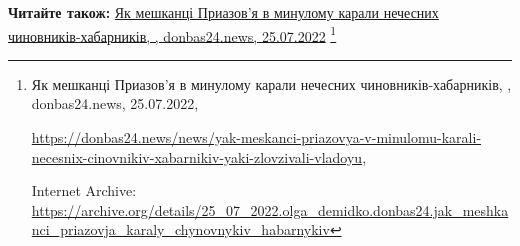  
 
 
 
 

\def\pubIA{https://archive.org/details/25_07_2022.olga_demidko.donbas24.jak_meshkanci_priazovja_karaly_chynovnykiv_habarnykiv}
\def\pubTitle{Як мешканці Приазов'я в минулому карали нечесних чиновників-хабарників}
\def\pubDate{25.07.2022}
\def\pubOrigin{https://donbas24.news/news/yak-meskanci-priazovya-v-minulomu-karali-necesnix-cinovnikiv-xabarnikiv-yaki-zlovzivali-vladoyu}
\def\pubAuthor{\pubAuthorDemidko}
\def\pubSite{donbas24.news}

\textbf{Читайте також:} \href{\pubIA}{%
\pubTitle, \pubAuthor, \pubSite, \pubDate}%
\footnote{\pubTitle, \pubAuthor, \pubSite, \pubDate, \par\url{\pubOrigin}, \par Internet Archive: \url{\pubIA}}
